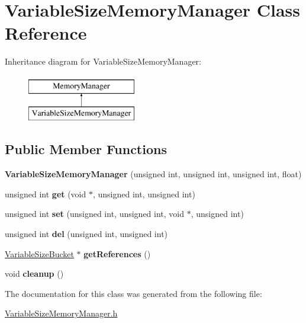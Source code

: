 \hypertarget{classVariableSizeMemoryManager}{\section{\-Variable\-Size\-Memory\-Manager \-Class \-Reference}
\label{classVariableSizeMemoryManager}
}
\-Inheritance diagram for \-Variable\-Size\-Memory\-Manager\-:\begin{figure}[H]
\begin{center}
\leavevmode
\includegraphics[height=2.000000cm]{classVariableSizeMemoryManager}
\end{center}
\end{figure}
\subsection*{\-Public \-Member \-Functions}
\begin{DoxyCompactItemize}
\item 
\hypertarget{classVariableSizeMemoryManager_a03006338e457d667b8a4d0d13af0bff4}{{\bfseries \-Variable\-Size\-Memory\-Manager} (unsigned int, unsigned int, unsigned int, float)}\label{classVariableSizeMemoryManager_a03006338e457d667b8a4d0d13af0bff4}

\item 
\hypertarget{classVariableSizeMemoryManager_ac5598eee7e38cb858ade9d643867c1bb}{unsigned int {\bfseries get} (void $\ast$, unsigned int, unsigned int)}\label{classVariableSizeMemoryManager_ac5598eee7e38cb858ade9d643867c1bb}

\item 
\hypertarget{classVariableSizeMemoryManager_af13ce44cb2a151e6e31723b29e6a129d}{unsigned int {\bfseries set} (unsigned int, unsigned int, void $\ast$, unsigned int)}\label{classVariableSizeMemoryManager_af13ce44cb2a151e6e31723b29e6a129d}

\item 
\hypertarget{classVariableSizeMemoryManager_a7fca71f5a112a22d52a8ebf7ce4984a5}{unsigned int {\bfseries del} (unsigned int, unsigned int)}\label{classVariableSizeMemoryManager_a7fca71f5a112a22d52a8ebf7ce4984a5}

\item 
\hypertarget{classVariableSizeMemoryManager_a1faed4a11b4ebe8642a2fc93dd7b679b}{\hyperlink{structvariablesizebucket}{\-Variable\-Size\-Bucket} $\ast$ {\bfseries get\-References} ()}\label{classVariableSizeMemoryManager_a1faed4a11b4ebe8642a2fc93dd7b679b}

\item 
\hypertarget{classVariableSizeMemoryManager_a554860923dc36f775fd5037078a42aeb}{void {\bfseries cleanup} ()}\label{classVariableSizeMemoryManager_a554860923dc36f775fd5037078a42aeb}

\end{DoxyCompactItemize}


\-The documentation for this class was generated from the following file\-:\begin{DoxyCompactItemize}
\item 
\hyperlink{VariableSizeMemoryManager_8h}{\-Variable\-Size\-Memory\-Manager.\-h}\end{DoxyCompactItemize}
